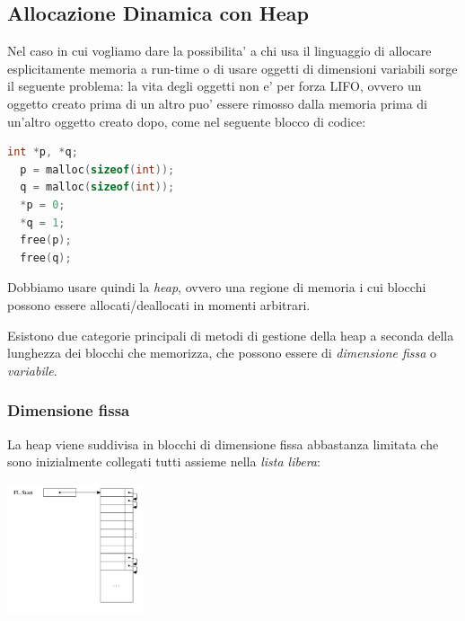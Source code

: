 
\subsection{Allocazione Dinamica con Heap}

Nel caso in cui vogliamo dare la possibilita' a chi usa il linguaggio di allocare esplicitamente memoria a run-time o di usare oggetti di dimensioni variabili sorge il seguente problema: la vita degli oggetti non e' per forza LIFO, ovvero un oggetto creato prima di un altro puo' essere rimosso dalla memoria prima di un'altro oggetto creato dopo, come nel seguente blocco di codice:

\begin{lstlisting}[language=C]
  int *p, *q;
  p = malloc(sizeof(int));
  q = malloc(sizeof(int));
  *p = 0;
  *q = 1;
  free(p);
  free(q);
\end{lstlisting}

Dobbiamo usare quindi la \textit{heap}, ovvero una regione di memoria i cui blocchi possono essere allocati/deallocati in momenti arbitrari.


Esistono due categorie principali di metodi di gestione della heap a seconda della lunghezza dei blocchi che memorizza, che possono essere di \textit{dimensione fissa} o \textit{variabile}.

\subsubsection{Dimensione fissa}

La heap viene suddivisa in blocchi di dimensione fissa abbastanza limitata che sono inizialmente collegati tutti assieme nella \textit{lista libera}:
\begin{center}
  \includegraphics[width=0.3\textwidth]{img/2025-03-02-15-29-56.png}
\end{center}


